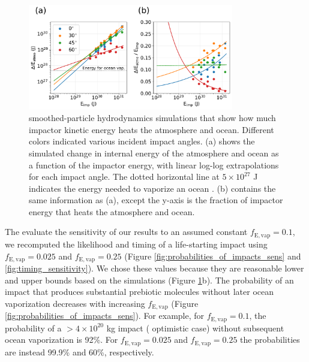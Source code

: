 \documentclass[manuscript]{aastex63}
\begin{document}
\begin{figure}
  \centering
  \includegraphics[width=0.8\textwidth]{figures/energy_for_ocean_vap.pdf}
  \caption{\citet{Citron_2022} smoothed-particle hydrodynamics simulations that show how much impactor kinetic energy heats the atmosphere and ocean. Different colors indicated various incident impact angles. (a) shows the simulated change in internal energy of the atmosphere and ocean as a function of the impactor energy, with linear log-log extrapolations for each impact angle. The dotted horizontal line at $5 \times 10^{27}$ J indicates the energy needed to vaporize an ocean \citep{Sleep_1989}. (b) contains the same information as (a), except the y-axis is the fraction of impactor energy that heats the atmosphere and ocean.}
  \label{fig:energy_for_ocean_vap}
\end{figure}

The evaluate the sensitivity of our results to an assumed constant $f_\mathrm{E,vap} = 0.1$, we recomputed the likelihood and timing of a life-starting impact using $f_\mathrm{E,vap} = 0.025$ and $f_\mathrm{E,vap} = 0.25$ (Figure \ref{fig:probabilities_of_impacts_sens} and \ref{fig:timing_sensitivity}). We chose these values because they are reasonable lower and upper bounds based on the \citet{Citron_2022} simulations (Figure \ref{fig:energy_for_ocean_vap}b). The probability of an impact that produces substantial prebiotic molecules without later ocean vaporization decreases with increasing $f_\mathrm{E,vap}$ (Figure \ref{fig:probabilities_of_impacts_sens}). For example, for $f_\mathrm{E,vap} = 0.1$, the probability of a $>4 \times 10^{20}$ kg impact (\citet{Wogan_2023} optimistic case) without subsequent ocean vaporization is 92\%. For $f_\mathrm{E,vap} = 0.025$ and $f_\mathrm{E,vap} = 0.25$ the probabilities are instead 99.9\% and 60\%, respectively.
\end{document}

